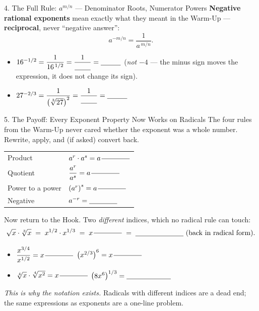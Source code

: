 \documentclass[10pt]{article}
\begin{document}
\begin{notesbox}{4. The Full Rule: $a^{m/n}$ --- Denominator Roots, Numerator Powers}
\vspace{2pt}
\textbf{Negative rational exponents} mean exactly what they meant in the Warm-Up ---
\textbf{reciprocal}, never ``negative answer'':
\[
  a^{-m/n} = \frac{1}{a^{\,m/n}} .
\]
\begin{itemize}[leftmargin=1.5em, itemsep=3pt]
  \item $16^{-1/2} = \dfrac{1}{16^{\,1/2}} = \dfrac{1}{\blank{0.8cm}} = \blank{1.0cm}$ \quad
        (\emph{not} $-4$ --- the minus sign moves the expression, it does not change its sign).
  \item $27^{-2/3} = \dfrac{1}{\left(\sqrt[3]{27}\right)^{2}} = \dfrac{1}{\blank{0.8cm}}
        = \blank{1.0cm}$
\end{itemize}
\end{notesbox}

\begin{notesbox}{5. The Payoff: Every Exponent Property Now Works on Radicals}
The four rules from the Warm-Up never cared whether the exponent was a whole number. Rewrite, apply,
and (if asked) convert back.
\begin{center}
\renewcommand{\arraystretch}{1.4}
\begin{tabularx}{\linewidth}{@{}l X@{}}
\hline
Product & $a^{r}\cdot a^{s}=a^{\,\blank{1.4cm}}$ \\
Quotient & $\dfrac{a^{r}}{a^{s}}=a^{\,\blank{1.4cm}}$ \\
Power to a power & $\left(a^{r}\right)^{s}=a^{\,\blank{1.4cm}}$ \\
Negative & $a^{-r}=\blank{1.4cm}$ \\
\hline
\end{tabularx}
\end{center}
Now return to the Hook. Two \emph{different} indices, which no radical rule can touch:
\[
  \sqrt{x}\cdot\sqrt[3]{x} \;=\; x^{1/2}\cdot x^{1/3}
  \;=\; x^{\,\blank{1.4cm}} \;=\; \blank{2.4cm}\ \text{(back in radical form)}.
\]
\begin{itemize}[leftmargin=1.5em, itemsep=3pt]
  \item $\dfrac{x^{3/4}}{x^{1/2}} = x^{\,\blank{1.4cm}}$ \hfill
        $\left(x^{2/3}\right)^{6} = x^{\,\blank{1.4cm}}$
  \item $\sqrt[4]{x}\cdot\sqrt[4]{x^{2}} = x^{\,\blank{1.4cm}}$ \hfill
        $\left(8x^{6}\right)^{1/3} = \blank{2.2cm}$
\end{itemize}
\emph{This is why the notation exists.} Radicals with different indices are a dead end; the same
expressions as exponents are a one-line problem.
\end{notesbox}
\end{document}

